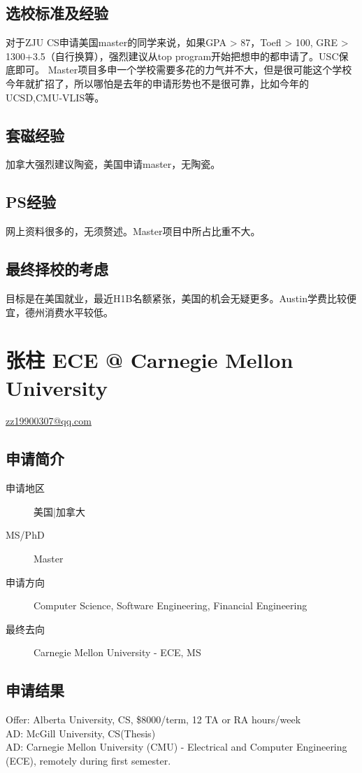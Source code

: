 \documentclass[11pt,fleqn,openany]{book} %
\begin{document}
\subsection*{选校标准及经验}
对于ZJU CS申请美国master的同学来说，如果GPA > 87，Toefl > 100, GRE > 1300+3.5（自行换算），强烈建议从top program开始把想申的都申请了。USC保底即可。
Master项目多申一个学校需要多花的力气并不大，但是很可能这个学校今年就扩招了，所以哪怕是去年的申请形势也不是很可靠，比如今年的UCSD,CMU-VLIS等。
\subsection*{套磁经验}
加拿大强烈建议陶瓷，美国申请master，无陶瓷。
\subsection*{PS经验}
网上资料很多的，无须赘述。Master项目中所占比重不大。
\subsection*{最终择校的考虑}
目标是在美国就业，最近H1B名额紧张，美国的机会无疑更多。Austin学费比较便宜，德州消费水平较低。
\clearpage
\section{张柱 ECE @ Carnegie Mellon University}
\hfill \href{mailto:zz19900307@qq.com}{zz19900307@qq.com}

\noindent\begin{minipage}[t]{0.45\textwidth}
\subsection*{申请简介}
\begin{description}
\item[申请地区] 美国|加拿大
\item[MS/PhD] Master
\item[申请方向] Computer Science, Software Engineering, Financial Engineering
\item[最终去向] Carnegie Mellon University - ECE, MS
\end{description}
\end{minipage}
\hfill
\begin{minipage}[t]{0.45\textwidth}
\subsection*{申请结果}
\noindent Offer: Alberta University, CS, \$8000/term, 12 TA or RA hours/week\\
AD: McGill University, CS(Thesis)\\
AD: Carnegie Mellon University (CMU) - Electrical and Computer Engineering (ECE), remotely during first semester.
\end{minipage}
\end{document}

